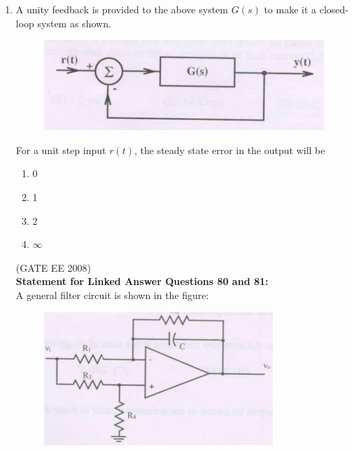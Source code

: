 \documentclass[journal,12pt,onecolumn]{IEEEtran}
\theoremstyle{remark}
\begin{document}
\begin{enumerate}[start=1, label=Q.\arabic*]
\item A unity feedback is provided to the above system $G(s)$ to make it a closed-loop system as shown.
\begin{figure}
    \centering
    \includegraphics[width=\columnwidth]{Fig/q79.png}
    \caption{}
\end{figure}

  For a unit step input $r(t)$, the steady state error in the output will be
\begin{multicols}{4}
\begin{enumerate}
    \item 0
    \item 1
    \item 2
    \item $\infty$
\end{enumerate}
\end{multicols}
\hfill (GATE EE 2008) \\[5mm]


\textbf{Statement for Linked Answer Questions 80 and 81:}\\

A general filter circuit is shown in the figure:

\begin{figure}
    \centering
    \includegraphics[width=\columnwidth]{Fig/comp4.png}
    \caption{}
\end{figure}


\end{enumerate}
\end{document}
